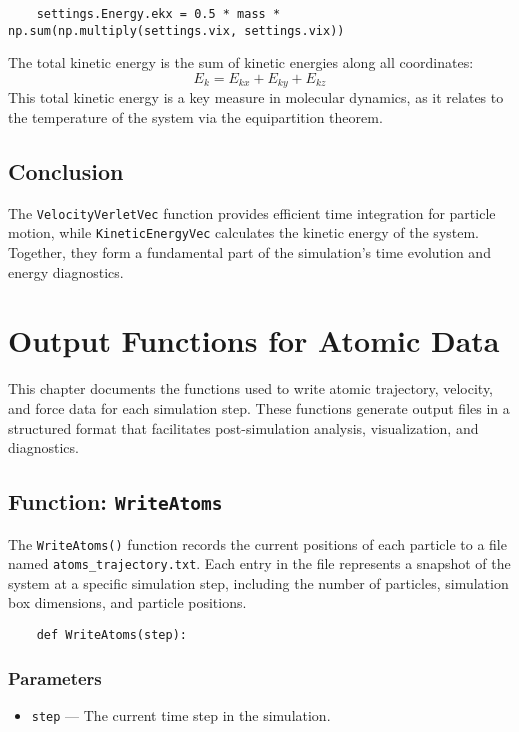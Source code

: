 \documentclass[12pt, ngerman]{report}
\begin{document}
\begin{verbatim}
	settings.Energy.ekx = 0.5 * mass * np.sum(np.multiply(settings.vix, settings.vix))
\end{verbatim}

The total kinetic energy is the sum of kinetic energies along all coordinates:
\[
E_k = E_{kx} + E_{ky} + E_{kz}
\]
This total kinetic energy is a key measure in molecular dynamics, as it relates to the temperature of the system via the equipartition theorem.

\section{Conclusion}
The \texttt{VelocityVerletVec} function provides efficient time integration for particle motion, while \texttt{KineticEnergyVec} calculates the kinetic energy of the system. Together, they form a fundamental part of the simulation's time evolution and energy diagnostics.

\chapter{Output Functions for Atomic Data}
\label{chap:output}

This chapter documents the functions used to write atomic trajectory, velocity, and force data for each simulation step. These functions generate output files in a structured format that facilitates post-simulation analysis, visualization, and diagnostics.

\section{Function: \texttt{WriteAtoms}}
\label{sec:writeatoms}

The \texttt{WriteAtoms()} function records the current positions of each particle to a file named \texttt{atoms\_trajectory.txt}. Each entry in the file represents a snapshot of the system at a specific simulation step, including the number of particles, simulation box dimensions, and particle positions.

\begin{verbatim}
	def WriteAtoms(step):
\end{verbatim}

\subsection*{Parameters}
\begin{itemize}
	\item \texttt{step} --- The current time step in the simulation.
\end{itemize}
\end{document}
